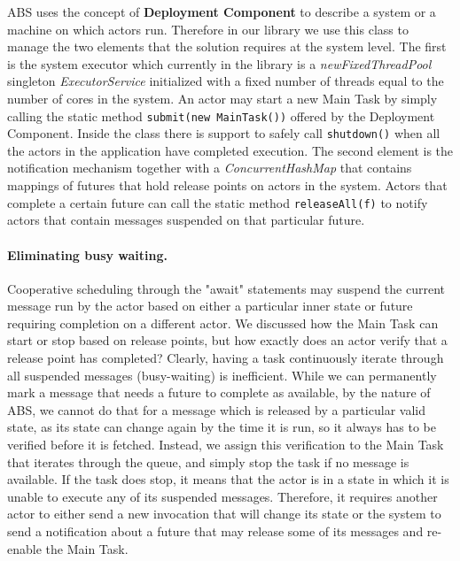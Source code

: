 \par ABS uses the concept of \textbf{Deployment Component} to describe a system or a machine on which actors run. Therefore in our library we use this class to manage the two elements that the solution requires at the system level. The first is the system executor which currently in the library is a \textit{newFixedThreadPool} singleton \textit{ExecutorService} initialized with a fixed number of threads equal to the number of cores in the system. An actor may start a new Main Task by simply calling the static method \lstinline|submit(new MainTask())| offered by the Deployment Component. Inside the class there is support to safely call \lstinline|shutdown()| when all the actors in the application have completed execution. The second element is the notification mechanism together with a \textit{ConcurrentHashMap} that contains mappings of futures that hold release points on actors in the system. Actors that complete a certain future can call the static method \lstinline|releaseAll(f)| to notify actors that contain messages suspended on that particular future. 

\paragraph{Eliminating busy waiting.}
Cooperative scheduling through the "await" statements may suspend the current message run by the actor based on either a particular inner state or future requiring completion on a different actor. We discussed how the Main Task can start or stop based on release points, but how exactly does an actor verify that a release point has completed? Clearly, having a task continuously iterate through all suspended messages (busy-waiting) is inefficient. While we can permanently mark a message that needs a future to complete as available, by the nature of ABS, we cannot do that for a message which is released by a particular valid state, as its state can change again by the time it is run, so it always has to be verified before it is fetched. Instead, we assign this verification to the Main Task that iterates through the queue, and simply stop the task if no message is available. If the task does stop, it means that the actor is in a state in which it is unable to execute any of its suspended messages. Therefore, it requires another actor to either send a new invocation that will change its state or the system to send a notification about a future that may release some of its messages and re-enable the Main Task. 


